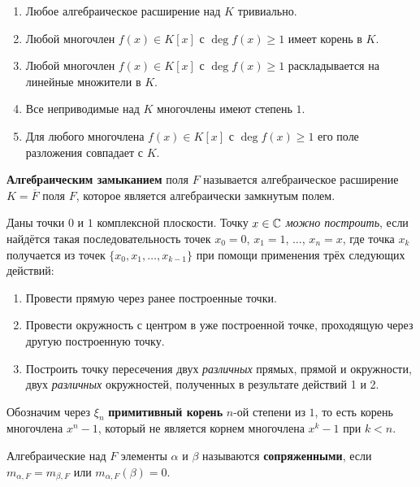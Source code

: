 \begin{enumerate}
\def\labelenumi{(\arabic{enumi})}
\tightlist
\item
  Любое алгебраическое расширение над \(K\) тривиально.
\item
  Любой многочлен \(f(x) \in K[x]\) с \(\deg f(x) \geq 1\) имеет корень в \(K\).
\item
  Любой многочлен \(f(x) \in K[x]\) с \(\deg f(x) \geq 1\) раскладывается на линейные множители в \(K\).
\item
  Все неприводимые над \(K\) многочлены имеют степень \(1\).
\item
  Для любого многочлена \(f(x) \in K[x]\) с \(\deg f(x) \geq 1\) его поле разложения совпадает с \(K\).
\end{enumerate}


\textbf{Алгебраическим замыканием} поля \(F\) называется алгебраическое расширение \(K=\overline{F}\) поля \(F\), которое является алгебраически замкнутым полем.


Даны точки \(0\) и \(1\) комплексной плоскости. Точку \(x \in \mathbb{C}\) \textit{можно построить}, если найдётся такая последовательность точек \(x_0=0\), \(x_1=1\), \(\ldots\), \(x_n=x\), где точка \(x_k\) получается из точек \(\{x_0,x_1,\ldots, x_{k-1}\}\) при помощи применения трёх следующих действий:

\begin{enumerate}
\def\labelenumi{\arabic{enumi}.}
\tightlist
\item
  Провести прямую через ранее построенные точки.
\item
  Провести окружность с центром в уже построенной точке, проходящую через другую построенную точку.
\item
  Построить точку пересечения двух \emph{различных} прямых, прямой и окружности, двух \emph{различных} окружностей, полученных в результате действий 1 и 2.
\end{enumerate}


Обозначим через \(\xi_n\) \textbf{примитивный корень} \(n\)-ой степени из \(1\), то есть корень многочлена \(x^n-1\), который не является корнем многочлена \(x^k-1\) при \(k<n\).

Алгебраические над \(F\) элементы \(\alpha\) и \(\beta\) называются \textbf{сопряженными}, если \(m_{\alpha,F} = m_{\beta,F}\) или \(m_{\alpha,F}(\beta)=0\).

